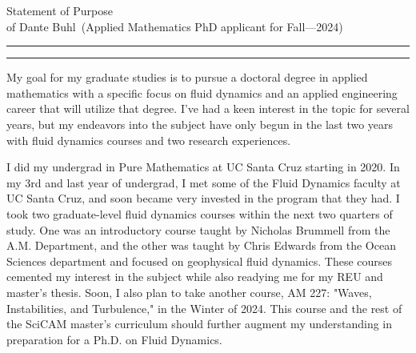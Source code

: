 \documentclass{article}
\newcommand{\soptitle}{Statement of Purpose}
\newcommand{\yourname}{Dante Buhl}
\begin{document}
\begin{center}\LARGE\soptitle\\
\large of \yourname\ (Applied Mathematics PhD applicant for Fall---2024)
\end{center}

\hrule
\vspace{1pt}
\hrule height 1pt

\bigskip

\large
My goal for my graduate studies is to pursue a doctoral degree in applied mathematics with a specific focus on fluid dynamics and an applied engineering career that will utilize that degree. I've had a keen interest in the topic for several years, but my endeavors into the subject have only begun in the last two years with fluid dynamics courses and two research experiences.

I did my undergrad in Pure Mathematics at UC Santa Cruz starting in 2020. In my 3rd and last year of undergrad, I met some of the Fluid Dynamics faculty at UC Santa Cruz, and soon became very invested in the program that they had. I took two graduate-level fluid dynamics courses within the next two quarters of study. One was an introductory course taught by Nicholas Brummell from the A.M. Department, and the other was taught by Chris Edwards from the Ocean Sciences department and focused on geophysical fluid dynamics. These courses cemented my interest in the subject while also readying me for my REU and master's thesis. Soon, I also plan to take another course, AM 227: "Waves, Instabilities, and Turbulence," in the Winter of 2024. This course and the rest of the SciCAM master's curriculum should further augment my understanding in preparation for a Ph.D. on Fluid Dynamics.
\end{document}
